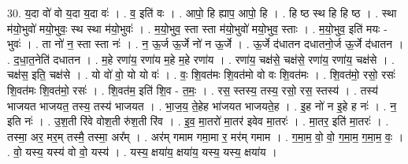 \documentclass[17pt]{extarticle}
\begin{document}
30. य॒दा वो॑ वो य॒दा य॒दा वः॑ । . व॒ इति॑ वः । . आपो॒ हि ह्याप॒ आपो॒ हि । . हि ष्ठ स्थ हि हि ष्ठ । . स्था म॑यो॒भुवो॑ मयो॒भुवः॒ स्थ स्था म॑यो॒भुवः॑ । . म॒यो॒भुव॒ स्ता स्ता म॑यो॒भुवो॑ मयो॒भुव॒ स्ताः । . म॒यो॒भुव॒ इति॑ मयः - भुवः॑ । . ता नो॑ न॒ स्ता स्ता नः॑ । . न॒ ऊ॒र्ज ऊ॒र्जे नो॑ न ऊ॒र्जे । . ऊ॒र्जे द॑धातन दधातनो॒र्ज ऊ॒र्जे द॑धातन । . द॒धा॒त॒नेति॑ दधातन । . म॒हे रणा॑य॒ रणा॑य म॒हे म॒हे रणा॑य । . रणा॑य॒ चक्ष॑से॒ चक्ष॑से॒ रणा॑य॒ रणा॑य॒ चक्ष॑से । . चक्ष॑स॒ इति॒ चक्ष॑से । . यो वो॑ वो॒ यो यो वः॑ । . वः॒ शि॒वत॑मः शि॒वत॑मो वो वः शि॒वत॑मः । . शि॒वत॑मो॒ रसो॒ रसः॑ शि॒वत॑मः शि॒वत॑मो॒ रसः॑ । . शि॒वत॑म॒ इति॑ शि॒व - त॒मः॒ । . रस॒ स्तस्य॒ तस्य॒ रसो॒ रस॒ स्तस्य॑ । . तस्य॑ भाजयत भाजयत॒ तस्य॒ तस्य॑ भाजयत । . भा॒ज॒य॒ ते॒हेह भा॑जयत भाजयते॒ह । . इ॒ह नो॑ न इ॒हे ह नः॑ । . न॒ इति नः॑ । . उ॒श॒ती रि॑वे वोश॒ती रु॑श॒ती रि॑व । . इ॒व॒ मा॒तरो॑ मा॒तर॑ इवेव मा॒तरः॑ । . मा॒तर॒ इति॑ मा॒तरः॑ । . तस्मा॒ अर॒ मर॒म् तस्मै॒ तस्मा॒ अर᳚म् । . अर॑म् गमाम गमा॒मा र॒ मर॑म् गमाम । . ग॒मा॒म॒ वो॒ वो॒ ग॒मा॒म॒ ग॒मा॒म॒ वः॒ । . वो॒ यस्य॒ यस्य॑ वो वो॒ यस्य॑ । . यस्य॒ क्षया॑य॒ क्षया॑य॒ यस्य॒ यस्य॒ क्षया॑य । \newline
\end{document}
